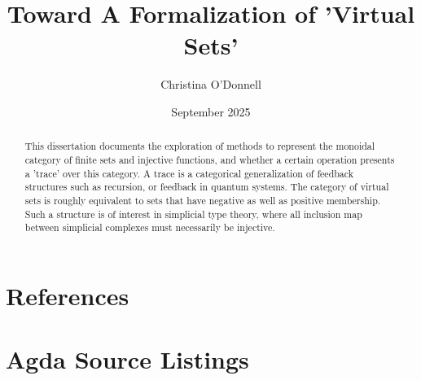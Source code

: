 \documentclass[4pt,a4paper]{report}
\title{Toward A Formalization of 'Virtual Sets'}
\author{Christina O'Donnell}
\date{September 2025}
\begin{document}
\maketitle
\begin{abstract}
This dissertation documents the exploration of methods to represent
the monoidal category of finite sets and injective functions, and whether a
certain operation presents a 'trace' over this category. A trace is a
categorical generalization of feedback structures such as recursion,
or feedback in quantum systems. The category of virtual sets is
roughly equivalent to sets that have negative as well as positive
membership. Such a structure is of interest in simplicial type theory,
where all inclusion map between simplicial complexes must necessarily
be injective.
\end{abstract}
\tableofcontents
\listoffigures
\listoftables






\appendix
\chapter{References}


\chapter{Agda Source Listings}
\end{document}
